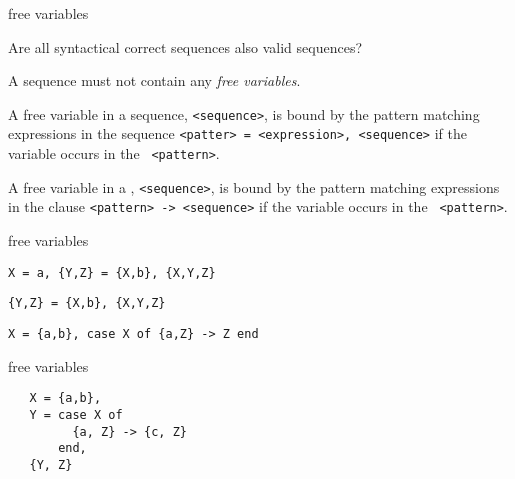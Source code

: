 \begin{frame}{free variables}

Are all syntactical correct sequences also valid sequences?

\pause\vspace{20pt}

A sequence must not contain any {\em free variables}.

\pause\vspace{10pt}

A free variable in a sequence, {\tt <sequence>}, is bound by the
pattern matching expressions in the sequence {\tt <patter> =
<expression>, <sequence>} if the variable occurs in the {\tt
<pattern>}.

\pause\vspace{10pt}

A free variable in a , {\tt <sequence>}, is bound by the
pattern matching expressions in the clause {\tt <pattern> -> <sequence>} if the variable occurs in the {\tt
<pattern>}.


\end{frame}

\begin{frame}{free variables}

{\tt X = a, \{Y,Z\} = \{X,b\}, \{X,Y,Z\}}

\pause\vspace{20pt}

{\tt \{Y,Z\} = \{X,b\}, \{X,Y,Z\}}


\pause\vspace{20pt}


{\tt X = \{a,b\}, case X of \{a,Z\} -> Z end}


\end{frame}



\begin{frame}[fragile]{free variables}

\vspace{20pt}

\hspace{20pt}\begin{verbatim}
   X = {a,b},
   Y = case X of
         {a, Z} -> {c, Z}
       end,
   {Y, Z}
\end{verbatim}


\end{frame}


